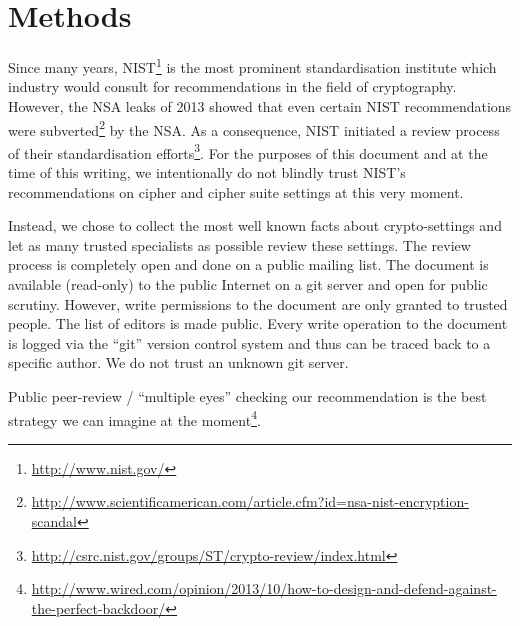 \section{Methods}

Since many years, NIST\footnote{\url{http://www.nist.gov/}} is the most
prominent standardisation institute which industry would consult for
recommendations in the field of cryptography. However, the NSA leaks of 2013
showed that even certain NIST recommendations were
subverted\footnote{\url{http://www.scientificamerican.com/article.cfm?id=nsa-nist-encryption-scandal}}
by the NSA.  As a consequence, NIST initiated a review process of their
standardisation
efforts\footnote{\url{http://csrc.nist.gov/groups/ST/crypto-review/index.html}}.
For the purposes of this document and at the time of this writing, we
intentionally do not blindly trust NIST's recommendations on cipher and cipher
suite settings at this very moment. 

Instead, we chose to collect the most well known facts about crypto-settings
and let as many trusted specialists as possible review these settings.  The
review process is completely open and done on a public mailing list. The
document is available (read-only) to the public Internet on a git server and
open for public scrutiny. However, write permissions to the document are only
granted to trusted people. The list of editors is made public.  Every write
operation to the document is logged via the ``git'' version control system and
thus can be traced back to a specific author.  We do not trust an unknown git
server. 

Public peer-review / ``multiple eyes'' checking our recommendation is the best
strategy we can imagine at the moment\footnote{\url{http://www.wired.com/opinion/2013/10/how-to-design-and-defend-against-the-perfect-backdoor/}}.

